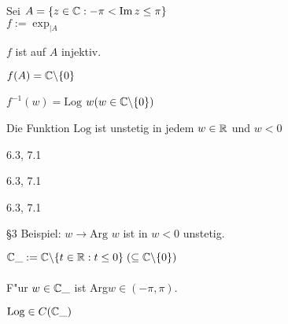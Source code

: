 \documentclass[a4paper,twoside,DIV15,BCOR12mm]{scrbook}
\def\Arg{\text{Arg}}
\def\Log{\text{Log}}
\begin{document}
\begin{satz} %
Sei $A = \{z \in \mathbb{C} : -\pi < \mathop{\rm Im}\nolimits z \leq \pi\}$ \\
$f := \exp _{|A}$
\begin{liste}
\item $f$ ist auf $A$ injektiv.
\item $f(A) = \mathbb{C}\backslash\{0\}$
\item $f^{-1}(w) = \Log $ $w (w \in \mathbb{C}\backslash\{0\})$
\item Die Funktion $\Log$ ist unstetig in jedem $w \in \mathbb{R}$ und $w < 0$
\end{liste}
\end{satz}

\begin{beweis}
\begin{liste}
\item 6.3, 7.1
\item 6.3, 7.1
\item 6.3, 7.1
\item §3 Beispiel: $w \rightarrow \Arg$ $ w$ ist in $w < 0$ unstetig.
\end{liste}
\end{beweis}



\begin{definition}
$\mathbb{C}\_ := \mathbb{C} \backslash \{ t \in \mathbb{R}: t \leq 0 \} \; (\subseteq \mathbb{C} \backslash \{0\})$\\
\\
F"ur $w \in \mathbb{C}\_$ ist Arg$w \in (-\pi,\pi)$.
\end{definition}

\begin{satz}
$\Log \in C(\MdC\_)$
\end{satz}
\end{document}
